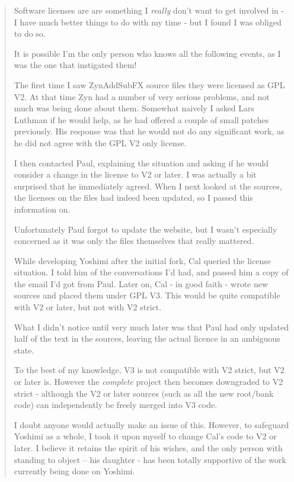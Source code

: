 \documentclass[
 11pt,
 twoside,
 a4paper,
 final                                 %
]{article}
\begin{document}
   \begin{quotation}
      Software licenses are are something I \textsl{really}
      don't want to get involved in - I have much better things to do with my
      time - but I found I was obliged to do so.

      It is possible I'm the only person who knows all the following events, as
      I was the one that instigated them!

      The first time I saw ZynAddSubFX source files they were licensed as GPL
      V2. At that time Zyn had a number of very serious problems, and not much
      was being done about them. Somewhat naively I asked Lars Luthman if he
      would help, as he had offered a couple of small patches previously. His
      response was that he would not do any significant work, as he did not
      agree with the GPL V2 only license.

      I then contacted Paul, explaining the situation and asking if he would
      consider a change in the license to V2 or later. I was actually a bit
      surprised that he immediately agreed. When I next looked at the sources,
      the licenses on the files had indeed been updated, so I passed this
      information on.

      Unfortunately Paul forgot to update the website, but I wasn't especially
      concerned as it was only the files themselves that really mattered.

      While developing Yoshimi after the initial fork, Cal queried the license
      situation. I told him of the conversations I'd had, and passed him a copy
      of the email I'd got from Paul. Later on, Cal - in good faith - wrote new
      sources and placed them under GPL V3. This would be quite compatible with
      V2 or later, but not with V2 strict.

      What I didn't notice until very much later was that Paul had only updated
      half of the text in the sources, leaving the actual licence in an
      ambiguous state.

      To the best of my knowledge, V3 is not compatible with V2 strict, but V2
      or later is. However the \textsl{complete}
      project then becomes downgraded to V2
      strict - although the V2 or later sources (such as all the new root/bank
      code) can independently be freely merged into V3 code.

      I doubt anyone would actually make an issue of this. However, to safeguard
      Yoshimi as a whole, I took it upon myself to change Cal's code to V2 or
      later. I believe it retains the spirit of his wishes, and the only person
      with standing to object -- his daughter - has been totally supportive of
      the work currently being done on Yoshimi.


\end{quotation}
\end{document}
